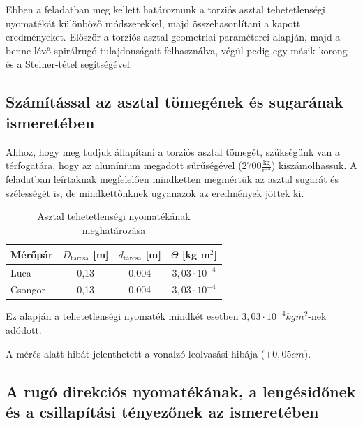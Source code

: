 \documentclass{article}
\begin{document}

Ebben a feladatban meg kellett határoznunk a torziós asztal tehetetlenségi nyomatékát különböző módszerekkel, majd összehasonlítani a kapott eredményeket. Először a torziós asztal geometriai paraméterei alapján, majd a benne lévő spirálrugó tulajdonságait felhasználva, végül pedig egy másik korong és a Steiner-tétel segítségével.

\renewcommand{\thesubsection}{\alph{subsection})}

\subsection{Számítással az asztal tömegének és sugarának ismeretében}

Ahhoz, hogy meg tudjuk állapítani a torziós asztal tömegét, szükségünk van a térfogatára, hogy az alumínium megadott sűrűségével ($2700 \frac{\text{kg}}{\text{m}^3}$) kiszámolhassuk. A feladatban leírtaknak megfelelően mindketten megmértük az asztal sugarát és szélességét is, de mindkettőnknek ugyanazok az eredmények jöttek ki.

\begin{table}[H]
    \centering
    \renewcommand{\arraystretch}{1.2}
    \begin{tabular}{|l|c|c|c|}
        \hline
        Mérőpár & $D_{\text{tárcsa}}$ [m] & $d_{\text{tárcsa}}$ [m] & $\Theta$ [kg m$^2$]  \\ \hline
        Luca    & 0,13                    & 0,004                   & $3,03 \cdot 10^{-4}$ \\ \hline
        Csongor & 0,13                    & 0,004                   & $3,03 \cdot 10^{-4}$ \\ \hline
    \end{tabular}
    \caption{Asztal tehetetlenségi nyomatékának meghatározása}
    \label{tab:hotan_2}
\end{table}

Ez alapján a tehetetlenségi nyomaték mindkét esetben $3,03 \cdot 10^{-4} kg m^2$-nek adódott.

A mérés alatt hibát jelenthetett a vonalzó leolvasási hibája ($\pm 0,05 cm$).

\subsection{A rugó direkciós nyomatékának, a lengésidőnek és a csillapítási tényezőnek az ismeretében}
\end{document}
